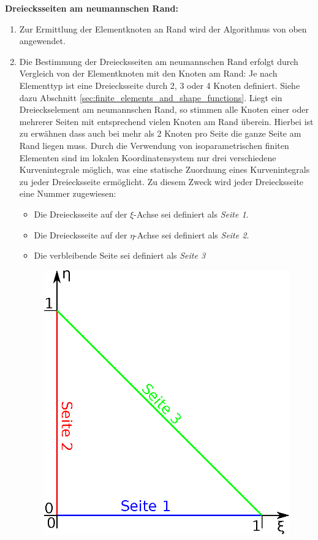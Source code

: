 \textbf{Dreiecksseiten am neumannschen Rand:}
\begin{enumerate}
	\item Zur Ermittlung der Elementknoten an Rand wird der Algorithmus von oben angewendet.
	\item Die Bestimmung der Dreiecksseiten am neumannschen Rand erfolgt durch Vergleich von der Elementknoten mit den Knoten am Rand:\newline
	Je nach Elementtyp ist eine Dreiecksseite durch 2, 3 oder 4 Knoten definiert. Siehe dazu Abschnitt \ref{sec:finite_elements_and_shape_functions}. Liegt ein Dreieckselement am neumannschen Rand, so stimmen alle Knoten einer oder mehrerer Seiten mit entsprechend vielen Knoten am Rand überein. Hierbei ist zu erwähnen dass auch bei mehr als 2 Knoten pro Seite die ganze Seite am Rand liegen muss. \newline
	Durch die Verwendung von isoparametrischen finiten Elementen sind im lokalen Koordinatensystem nur drei verschiedene Kurvenintegrale möglich, was eine statische Zuordnung eines Kurvenintegrals zu jeder Dreiecksseite ermöglicht. Zu diesem Zweck wird jeder Dreiecksseite eine Nummer zugewiesen:
	\begin{itemize}
		\item Die Dreiecksseite auf der $\xi$-Achse sei definiert als \textit{Seite 1}.
		\item Die Dreiecksseite auf der $\eta$-Achse sei definiert als \textit{Seite 2}.
		\item Die verbleibende Seite sei definiert als \textit{Seite 3}
	\end{itemize}
	\begin{figure}[H]
		\begin{center}
			\includegraphics[scale=0.65]{pics/triangle_side_assignment.eps}

\end{center}
\end{figure}
\end{enumerate}
